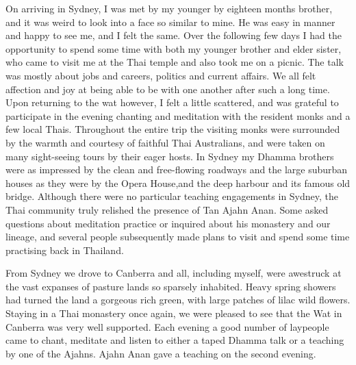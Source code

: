 On arriving in Sydney, I was met by my younger by eighteen months
brother, and it was weird to look into a face so similar to mine. He was
easy in manner and happy to see me, and I felt the same. Over the
following few days I had the opportunity to spend some time with both my
younger brother and elder sister, who came to visit me at the Thai
temple and also took me on a picnic. The talk was mostly about jobs and
careers, politics and current affairs. We all felt affection and joy at
being able to be with one another after such a long time. Upon returning
to the wat however, I felt a little scattered, and was grateful to
participate in the evening chanting and meditation with the resident
monks and a few local Thais. Throughout the entire trip the visiting
monks were surrounded by the warmth and courtesy of faithful Thai
Australians, and were taken on many sight-seeing tours by their eager
hosts. In Sydney my Dhamma brothers were as impressed by the clean and
free-flowing roadways and the large suburban houses as they were by the
Opera House,and the deep harbour and its famous old bridge. Although
there were no particular teaching engagements in Sydney, the Thai
community truly relished the presence of Tan Ajahn Anan. Some asked
questions about meditation practice or inquired about his monastery and
our lineage, and several people subsequently made plans to visit and
spend some time practising back in Thailand.

From Sydney we drove to Canberra and all, including myself, were
awestruck at the vast expanses of pasture lands so sparsely inhabited.
Heavy spring showers had turned the land a gorgeous rich green, with
large patches of lilac wild flowers. Staying in a Thai monastery once
again, we were pleased to see that the Wat in Canberra was very well
supported. Each evening a good number of laypeople came to chant,
meditate and listen to either a taped Dhamma talk or a teaching by one
of the Ajahns. Ajahn Anan gave a teaching on the second evening.

